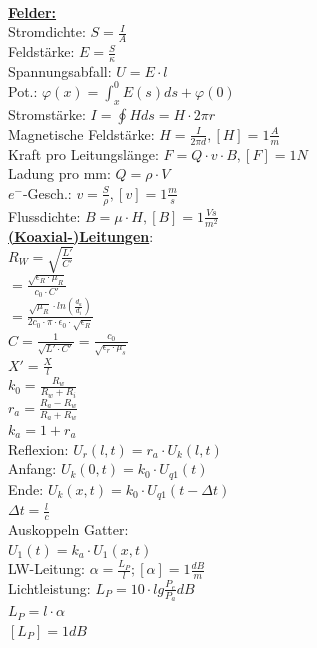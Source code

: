 \documentclass[11pt]{article}
\begin{document}
~~~~~~~
\begin{minipage}{0.33\textwidth}

\underline{\textbf{Felder:}}\\
Stromdichte: $S=\frac{I}{A}$\\
Feldstärke: $E=\frac{S}{\kappa}$\\
Spannungsabfall: $U=E \cdot l$\\
Pot.: $\varphi (x)= \int_x^0 E(s)ds + \varphi(0)$\\
Stromstärke: $I = \oint H ds = H \cdot 2\pi r$\\
Magnetische Feldstärke: $H = \frac{I}{2\pi d}, [H] = 1\frac{A}{m}$\\
Kraft pro Leitungslänge: $F=Q \cdot v \cdot B, [F] = 1N$\\
Ladung pro mm: $Q = \rho \cdot V$\\
$e^-$-Gesch.: $v = \frac{S}{\rho}, [v] = 1\frac{m}{s}$\\
Flussdichte: $B=\mu \cdot H, [B] = 1 \frac{Vs}{m^2}$\\
 
 \underline{\textbf{(Koaxial-)Leitungen}}:\\
$R_W = \sqrt{\frac{L'}{C'}}$\\
    \phantom{sssi} $=\frac{\sqrt{\epsilon_R \cdot \mu_R}}{c_0 \cdot C'}$\\
    \phantom{sssi} $=\frac{\sqrt{\mu_R} \cdot ln(\frac{d_a}{d_i})}{2c_0 \cdot \pi \cdot \epsilon_0 \cdot \sqrt{\epsilon_R}}$\\
$C = \frac{1}{\sqrt{L' \cdot C'}} = \frac{c_0}{\sqrt{\epsilon_r \cdot \mu_s}}$\\
$X' = \frac{X}{l}$\\

$k_0 = \frac{R_w}{R_w + R_i} $\\
$r_a = \frac{R_a - R_w}{R_a + R_w} $\\
$k_a = 1 + r_a$\\
Reflexion: $U_r(l,t) = r_a \cdot U_k(l,t)$\\
Anfang: $U_k(0,t)=k_0 \cdot U_{q1}(t)$\\
Ende: $U_k(x,t)= k_0 \cdot U_{q1}(t-\Delta t)$\\
$\Delta t = \frac{l}{c}$\\
Auskoppeln Gatter:\\
\phantom{ss} $U_1(t) = k_a \cdot U_1(x,t)$\\

LW-Leitung: $\alpha = \frac{L_P}{l}; [\alpha] = 1 \frac{dB}{m}$\\
Lichtleistung: $L_P = 10 \cdot lg\frac{P_e}{P_a} dB$\\
\phantom{sssssississsssss} $L_P = l \cdot \alpha$\\
\phantom{sssssississsssss}$ [L_P] = 1dB$\\



\end{minipage}%
\end{document}
